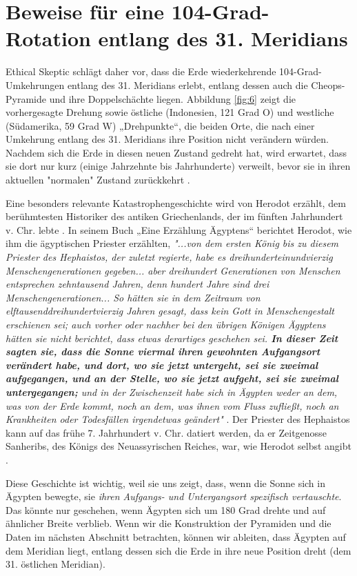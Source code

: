 \documentclass[10pt,twocolumn,letterpaper]{article}
\begin{document}
\section{Beweise für eine 104-Grad-Rotation entlang des 31. Meridians}

Ethical Skeptic schlägt daher vor, dass die Erde wiederkehrende 104-Grad-Umkehrungen entlang des 31. Meridians erlebt, entlang dessen auch die Cheops-Pyramide und ihre Doppelschächte liegen. Abbildung \ref{fig:6} zeigt die vorhergesagte Drehung sowie östliche (Indonesien, 121 Grad O) und westliche (Südamerika, 59 Grad W) „Drehpunkte“, die beiden Orte, die nach einer Umkehrung entlang des 31. Meridians ihre Position nicht verändern würden. Nachdem sich die Erde in diesen neuen Zustand gedreht hat, wird erwartet, dass sie dort nur kurz (einige Jahrzehnte bis Jahrhunderte) verweilt, bevor sie in ihren aktuellen "normalen" Zustand zurückkehrt \cite{150}.

Eine besonders relevante Katastrophengeschichte wird von Herodot erzählt, dem berühmtesten Historiker des antiken Griechenlands, der im fünften Jahrhundert v. Chr. lebte \cite{31}. In seinem Buch „Eine Erzählung Ägyptens“ berichtet Herodot, wie ihm die ägyptischen Priester erzählten, \textit{"...von dem ersten König bis zu diesem Priester des Hephaistos, der zuletzt regierte, habe es dreihunderteinundvierzig Menschengenerationen gegeben... aber dreihundert Generationen von Menschen entsprechen zehntausend Jahren, denn hundert Jahre sind drei Menschengenerationen... So hätten sie in dem Zeitraum von elftausenddreihundertvierzig Jahren gesagt, dass kein Gott in Menschengestalt erschienen sei; auch vorher oder nachher bei den übrigen Königen Ägyptens hätten sie nicht berichtet, dass etwas derartiges geschehen sei. \textbf{In dieser Zeit sagten sie, dass die Sonne viermal ihren gewohnten Aufgangsort verändert habe, und dort, wo sie jetzt untergeht, sei sie zweimal aufgegangen, und an der Stelle, wo sie jetzt aufgeht, sei sie zweimal untergegangen;} und in der Zwischenzeit habe sich in Ägypten weder an dem, was von der Erde kommt, noch an dem, was ihnen vom Fluss zufließt, noch an Krankheiten oder Todesfällen irgendetwas geändert"} \cite{32}. Der Priester des Hephaistos kann auf das frühe 7. Jahrhundert v. Chr. datiert werden, da er Zeitgenosse Sanheribs, des Königs des Neuassyrischen Reiches, war, wie Herodot selbst angibt \cite{32,33,34}.

Diese Geschichte ist wichtig, weil sie uns zeigt, dass, wenn die Sonne sich in Ägypten bewegte, sie \textit{ihren Aufgangs- und Untergangsort spezifisch vertauschte}. Das könnte nur geschehen, wenn Ägypten sich um 180 Grad drehte und auf ähnlicher Breite verblieb. Wenn wir die Konstruktion der Pyramiden und die Daten im nächsten Abschnitt betrachten, können wir ableiten, dass Ägypten auf dem Meridian liegt, entlang dessen sich die Erde in ihre neue Position dreht (dem 31. östlichen Meridian).
\end{document}
